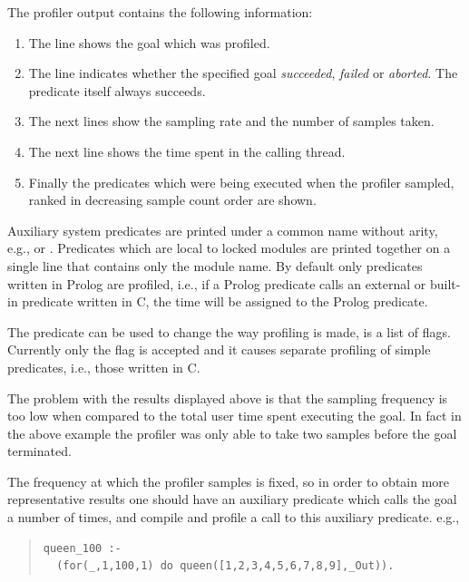 The profiler output contains the following information:
\begin{enumerate}
\item The line  shows the goal which was profiled.
\item The line  indicates whether the specified goal
\emph{succeeded}, \emph{failed} or \emph{aborted}.  The
 predicate itself always succeeds.
\item The next lines show the sampling rate and the number of samples taken.
\item The next line shows the time spent in the calling thread.
\item Finally the predicates which were being executed when the
profiler sampled, ranked in decreasing sample count order are shown.
\end{enumerate}


Auxiliary system predicates are printed under a
common name without arity, e.g.,  or
.
Predicates which are local to locked modules are printed
together on a single line that contains only the module name.
By default only predicates written in Prolog are profiled, i.e.,
if a Prolog predicate calls an external or built-in predicate
written in C, the time will be assigned to the Prolog predicate.

The predicate  can be used to change
the way profiling is made,  is a list of flags.
Currently only the flag  is accepted and it
causes separate profiling of simple predicates, i.e.,
those written in C.

The problem with the results displayed above is that the sampling
frequency is too low when compared to the total user time spent
executing the goal.  In fact in the above example the profiler was
only able to take two samples before the goal terminated.

The frequency at which the profiler samples is fixed, so in order to
obtain more representative results one should have an auxiliary
predicate which calls the goal a number of times, and compile and
profile a call to this auxiliary predicate. e.g.,

\begin{quote}
\begin{verbatim}
queen_100 :-
  (for(_,1,100,1) do queen([1,2,3,4,5,6,7,8,9],_Out)).
\end{verbatim}
\end{quote}

